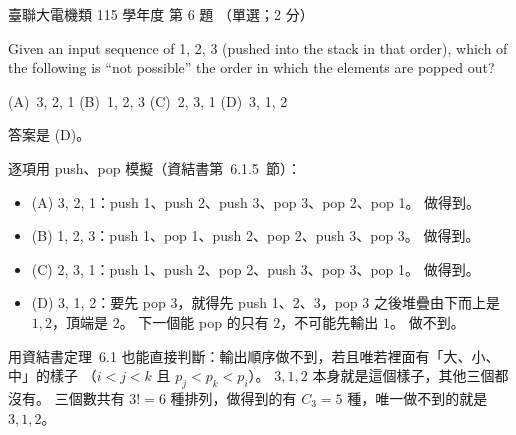 \begin{pastexam}[label={px:ust-115-ee-ds-06}]{臺聯大電機類 115 學年度 第 6 題}
（單選；2 分）

Given an input sequence of 1, 2, 3 (pushed into the stack in that order), which of the following is
``not possible'' the order in which the elements are popped out?

(A)~3, 2, 1 \qquad (B)~1, 2, 3 \qquad (C)~2, 3, 1 \qquad (D)~3, 1, 2
\end{pastexam}

\begin{pastsoln}
答案是 (D)。

逐項用 push、pop 模擬（資結書第~6.1.5~節）：
\begin{itemize}
\item (A) 3, 2, 1：push 1、push 2、push 3、pop 3、pop 2、pop 1。 做得到。
\item (B) 1, 2, 3：push 1、pop 1、push 2、pop 2、push 3、pop 3。 做得到。
\item (C) 2, 3, 1：push 1、push 2、pop 2、push 3、pop 3、pop 1。 做得到。
\item (D) 3, 1, 2：要先 pop 3，就得先 push 1、2、3，pop 3 之後堆疊由下而上是 $1, 2$，頂端是
$2$。 下一個能 pop 的只有 $2$，不可能先輸出 $1$。 做不到。
\end{itemize}
用資結書定理~6.1 也能直接判斷：輸出順序做不到，若且唯若裡面有「大、小、中」的樣子
（$i < j < k$ 且 $p_j < p_k < p_i$）。 $3, 1, 2$ 本身就是這個樣子，其他三個都沒有。
三個數共有 $3! = 6$ 種排列，做得到的有 $C_3 = 5$ 種，唯一做不到的就是 $3, 1, 2$。
\end{pastsoln}
